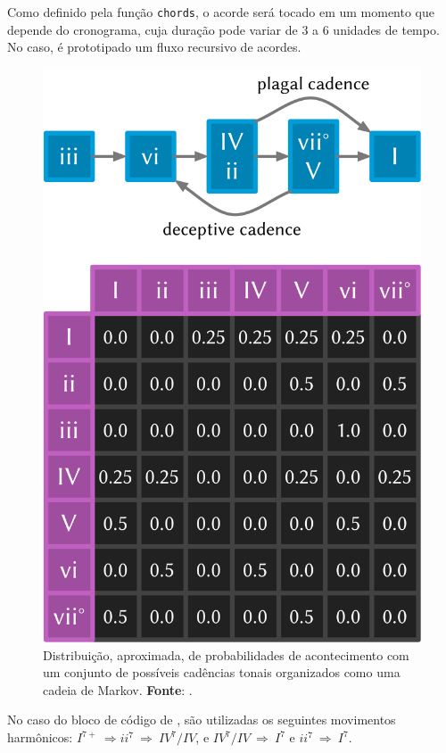 Como definido pela função \verb|chords|, o acorde será tocado em um momento que depende do cronograma, cuja duração pode variar de 3 a 6 unidades de tempo. No caso, é prototipado um fluxo recursivo de acordes.

\begin{figure}
  \centering
  \includegraphics[scale=0.3]{imagens/markov.png}
  \caption{Distribuição, aproximada, de probabilidades de acontecimento com um conjunto de possíveis cadências tonais organizados como uma cadeia de Markov. \textbf{Fonte}: .}
   \label{fig:markov}
\end{figure}

No caso do bloco de código de , são utilizadas os seguintes movimentos harmônicos: $I^{7+}~\Rightarrow ii^{7}~\Rightarrow~IV^{7}/IV$, e $IV^{7}/IV~\Rightarrow~I^{7}$ e $ii^{7}~\Rightarrow~I^{7}$.

